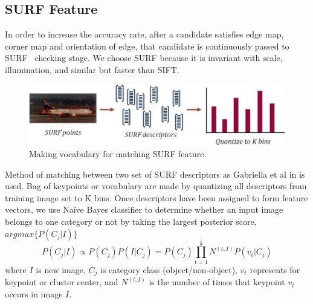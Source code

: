 \subsection{SURF Feature}
In order to increase the accuracy rate, after a candidate satisfies edge
map, corner map and orientation of edge, that candidate is continuously
passed to SURF~\cite{bay2008surf} checking stage. We choose SURF because it
is invariant with scale, illumination, and similar but faster than SIFT.
\begin{figure}[ht]
  \centering
  \includegraphics[width=3.in]{images/surf.jpg}
  \caption{Making vocabulary for matching SURF feature.}
  \label{fig:making_surf}
\end{figure}
Method of matching between two set of SURF descriptors as
Gabriella et al in\cite{lazebnik2006beyond,csurka2004visual} is used. Bag of keypoints or vocabulary
are made by quantizing all descriptors from training image set to K
bins. Once descriptors have been assigned to form feature vectors,
we use Naïve Bayes classifier to determine whether an input image
belongs to one category or not by taking the largest posterior score,
$argmax\{P(C_j|I)\}$
\begin{equation}
   P(C_j|I) \propto P(C_j)P(I|C_j)= P(C_j)\prod_{t=1}^{k} N^{(t,I)} P(v_t|C_j)
   \label{eq:surf}
\end{equation}
where $I$ is new image, $C_j$ is category class (object/non-object), $v_t$
represents for keypoint or cluster center, and $N^{(t,I)}$ is the number of
times that keypoint $v_t$ occurs in image $I$.
